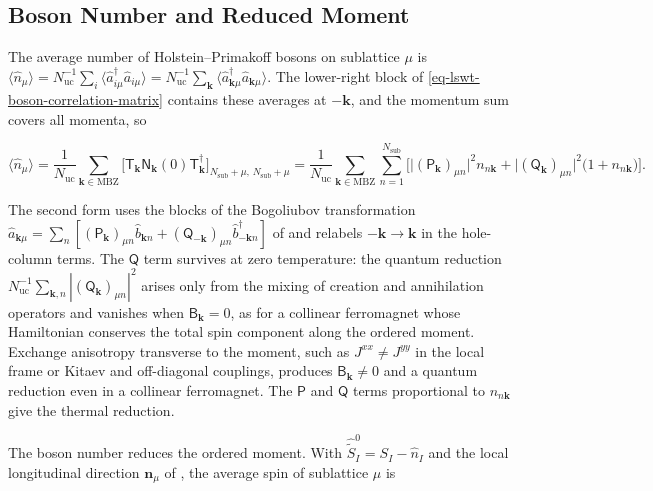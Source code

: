 \subsection{Boson Number and Reduced Moment}

The average number of Holstein--Primakoff bosons on sublattice \(\mu\) is \(\langle\hat n_\mu\rangle=N_{\mathrm{uc}}^{-1}\sum_i\langle\hat a_{i\mu}^\dagger\hat a_{i\mu}\rangle=N_{\mathrm{uc}}^{-1}\sum_{\mathbf k}\langle\hat a_{\mathbf k\mu}^\dagger\hat a_{\mathbf k\mu}\rangle\). The lower-right block of \eqref{eq-lswt-boson-correlation-matrix} contains these averages at \(-\mathbf k\), and the momentum sum covers all momenta, so

\begin{equation}\label{eq-lswt-boson-number}
\langle\hat n_\mu\rangle
=\frac{1}{N_{\mathrm{uc}}}\sum_{\mathbf k\in\mathrm{MBZ}}\Big[\mathsf T_{\mathbf k}\mathsf N_{\mathbf k}(0)\mathsf T_{\mathbf k}^\dagger\Big]_{N_{\mathrm{sub}}+\mu,\,N_{\mathrm{sub}}+\mu}
=\frac{1}{N_{\mathrm{uc}}}\sum_{\mathbf k\in\mathrm{MBZ}}\sum_{n=1}^{N_{\mathrm{sub}}}
\Big[\big|(\mathsf P_{\mathbf k})_{\mu n}\big|^2n_{n\mathbf k}+\big|(\mathsf Q_{\mathbf k})_{\mu n}\big|^2\big(1+n_{n\mathbf k}\big)\Big].
\end{equation}

The second form uses the blocks of the Bogoliubov transformation \(\hat a_{\mathbf k\mu}=\sum_n[(\mathsf P_{\mathbf k})_{\mu n}\hat b_{\mathbf kn}+(\mathsf Q_{-\mathbf k})_{\mu n}\hat b_{-\mathbf kn}^\dagger]\) of  and relabels \(-\mathbf k\to\mathbf k\) in the hole-column terms. The \(\mathsf Q\) term survives at zero temperature: the quantum reduction \(N_{\mathrm{uc}}^{-1}\sum_{\mathbf k,n}|(\mathsf Q_{\mathbf k})_{\mu n}|^2\) arises only from the mixing of creation and annihilation operators and vanishes when \(\mathsf B_{\mathbf k}=0\), as for a collinear ferromagnet whose Hamiltonian conserves the total spin component along the ordered moment. Exchange anisotropy transverse to the moment, such as \(J^{xx}\ne J^{yy}\) in the local frame or Kitaev and off-diagonal couplings, produces \(\mathsf B_{\mathbf k}\ne0\) and a quantum reduction even in a collinear ferromagnet. The \(\mathsf P\) and \(\mathsf Q\) terms proportional to \(n_{n\mathbf k}\) give the thermal reduction.

The boson number reduces the ordered moment. With \(\hat{\widetilde S}_I^0=S_I-\hat n_I\) and the local longitudinal direction \(\mathbf n_\mu\) of , the average spin of sublattice \(\mu\) is

